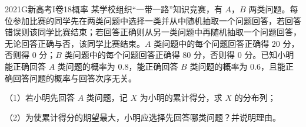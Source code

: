 
\begin{problem}{2021}{G}{新高考I卷}{18}{概率}
某学校组织“一带一路”知识竞赛，有 $ A $，$ B $ 两类问题。每位参加比赛的同学先在两类问题中选择一类并从中随机抽取一个问题回答，若回答错误则该同学比赛结束；若回答正确则从另一类问题中再随机抽取一个问题回答，无论回答正确与否，该同学比赛结束。$ A $ 类问题中的每个问题回答正确得 $ 20 $ 分，否则得 $ 0 $ 分；$ B $ 类问题中的每个问题回答正确得 $ 80 $ 分，否则得 $ 0 $ 分。已知小明能正确回答 $ A $ 类问题的概率为 $ 0.8 $，能正确回答 $ B $ 类问题的概率为 $ 0.6 $，且能正确回答问题的概率与回答次序无关。

（1）若小明先回答 $ A $ 类问题，记 $ X $ 为小明的累计得分，求 $ X $ 的分布列；

（2）为使累计得分的期望最大，小明应选择先回答哪类问题？并说明理由。
\end{problem}
